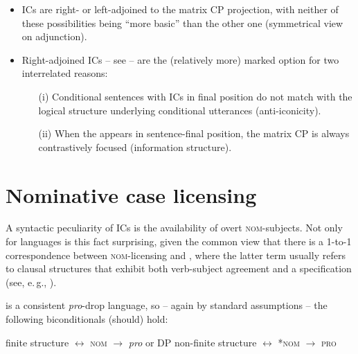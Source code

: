 \documentclass[output=paper,colorlinks,citecolor=brown,newtxmath]{langsci/langscibook}
\begin{document}
\begin{itemize}

\item ICs are right- or left-adjoined to the matrix CP projection, with neither of these possibilities being ``more basic'' than the other one (symmetrical view on adjunction).

\item Right-adjoined ICs -- see  -- are the (relatively more) marked option for two interrelated reasons:

	\begin{itemize}

	\item[(i)] Conditional sentences with ICs in final position do not match with the logical structure underlying conditional utterances (anti-iconicity).

	\item[(ii)] When the  appears in sentence-final position, the matrix CP is always contrastively focused (information structure).

	\end{itemize}

\end{itemize}


\section{Nominative case licensing}\label{sec:nom}

A syntactic peculiarity of ICs is the availability of overt \textsc{nom}-subjects. Not only for  languages is this fact surprising, given the common view that there is a 1-to-1 correspondence between \textsc{nom}-licensing and , where the latter term usually refers to clausal structures that exhibit both verb-subject agreement and a  specification (see, e.\,g., \citealt[4]{Cowper2002}).

 is a consistent \textit{pro}-drop language, so -- again by standard assumptions -- the following biconditionals (should) hold:

\ea\label{ex:finiteness}
\ea finite structure $\leftrightarrow$ \textsc{nom} \hfill $\rightarrow$ \textit{pro} or DP
\ex non-finite structure $\leftrightarrow$ \textsc{*nom} \hfill $\rightarrow$ \textsc{pro}
\z
\z
\end{document}

